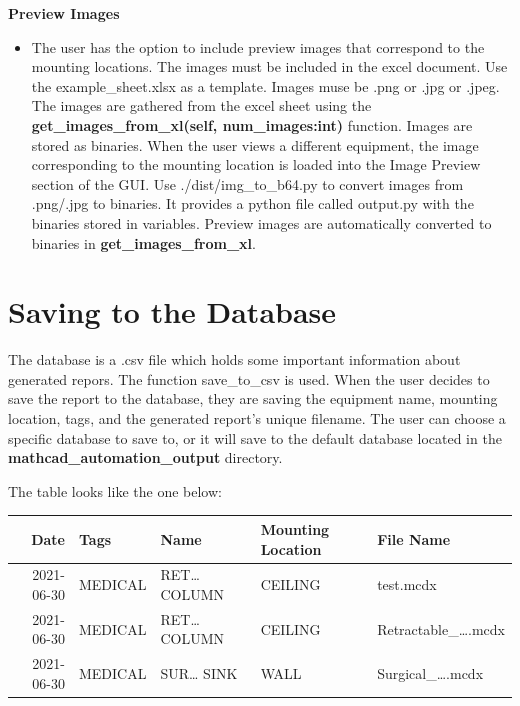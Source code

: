 \documentclass[11pt]{article}
\begin{document}
\textbf{Preview Images}
\begin{itemize}
\item The user has the option to include preview images that correspond to the mounting locations. The images must be included in the excel document. Use the example\_sheet.xlsx as a template. Images muse be .png or .jpg or .jpeg. The images are gathered from the excel sheet using the \textbf{get\_images\_from\_xl(self, num\_images:int)} function. Images are stored as binaries. When the user views a different equipment, the image corresponding to the mounting location is loaded into the Image Preview section of the GUI. Use ./dist/img\_to\_b64.py to convert images from .png/.jpg to binaries. It provides a python file called output.py with the binaries stored in variables. Preview images are automatically converted to binaries in \textbf{get\_images\_from\_xl}.
\end{itemize}

\section{Saving to the Database}
\label{sec:orge56a190}
The database is a .csv file which holds some important information about generated repors. The function save\_to\_csv is used. When the user decides to save the report to the database, they are saving the equipment name, mounting location, tags, and the generated report's unique filename. The user can choose a specific database to save to, or it will save to the default database located in the \textbf{mathcad\_automation\_output} directory.

The table looks like the one below:
\begin{center}
\begin{tabular}{rllll}
\hline
Date & Tags & Name & Mounting Location & File Name\\
\hline
2021-06-30 & MEDICAL & RET\ldots{} COLUMN & CEILING & test.mcdx\\
2021-06-30 & MEDICAL & RET\ldots{} COLUMN & CEILING & Retractable\_\ldots{}.mcdx\\
2021-06-30 & MEDICAL & SUR\ldots{} SINK & WALL & Surgical\_\ldots{}.mcdx\\
\hline
\end{tabular}
\end{center}
\end{document}
